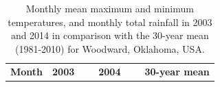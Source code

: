 \documentclass[agronomy,article,submit,moreauthors,pdftex,10pt,a4paper]{mdpi}
\theoremstyle{mdpi}
\newcounter{ex}
\newcounter{re}
\theoremstyle{mdpidefinition}
\begin{document}
\begin{table}

\captionsetup[table]{labelsep=space, 
         justification=raggedright, singlelinecheck=off}

\caption{Monthly mean maximum and minimum temperatures, and monthly total rainfall in 2003 and 2014 in comparison with the 30-year mean (1981-2010) for Woodward, Oklahoma, USA.}
\label{table1}
\begin{tabular}{llllllllllll} 
\toprule
\multirow{2}{*}{\textbf{Month}} & \multicolumn{3}{c}{\textbf{2003}}                                                                                                                                                                                                      & ~ & \multicolumn{3}{c}{\textbf{2004}}                                                                                                                                                                                                      & ~ & \multicolumn{3}{c}{\textbf{30-year mean}}                                                                                                                                                                                             \\ 
\cmidrule{2-2}\cmidrule{3-3}\cmidrule{4-4}\cmidrule{6-6}\cmidrule{7-7}\cmidrule{8-8}\cmidrule{10-10}\cmidrule{11-11}\cmidrule{12-12}

\end{tabular}
\end{table}
\end{document}
